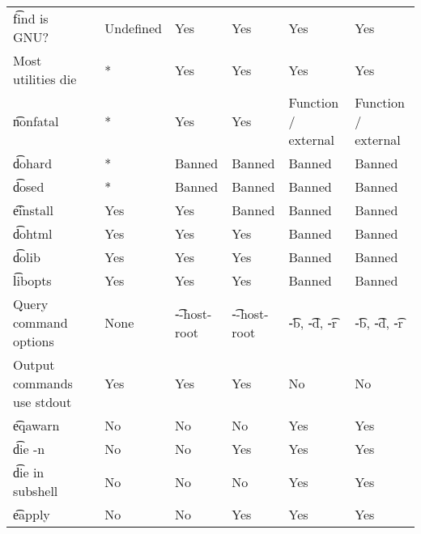 \begin{landscape}
\begin{longtable}{llP{7.5em}P{7.5em}P{7.5em}P{7.5em}P{7.5em}}
\t{find} is GNU? &  &
    Undefined & Yes & Yes & Yes & Yes \\

Most utilities die &  &
    * & Yes & Yes & Yes & Yes \\

\t{nonfatal} &  &
    * & Yes & Yes & Function / external & Function / external \\

\t{dohard} &  &
    * & Banned & Banned & Banned & Banned \\

\t{dosed} &  &
    * & Banned & Banned & Banned & Banned \\

\t{einstall} &  &
    Yes & Yes & Banned & Banned & Banned \\

\t{dohtml} &  &
    Yes & Yes & Yes & Banned & Banned \\

\t{dolib} &  &
    Yes & Yes & Yes & Banned & Banned \\

\t{libopts} &  &
    Yes & Yes & Yes & Banned & Banned \\

Query command options &  &
    None & \t{-{}-host-root} & \t{-{}-host-root} & \t{-b}, \t{-d}, \t{-r} &
    \t{-b}, \t{-d}, \t{-r} \\

Output commands use stdout &  &
    Yes & Yes & Yes & No & No \\

\t{eqawarn} &  &
    No & No & No & Yes & Yes \\

\t{die -n} &  &
    No & No & Yes & Yes & Yes \\

\t{die} in subshell &  &
    No & No & No & Yes & Yes \\

\t{eapply} &  &
    No & No & Yes & Yes & Yes \\


\end{longtable}
\end{landscape}
